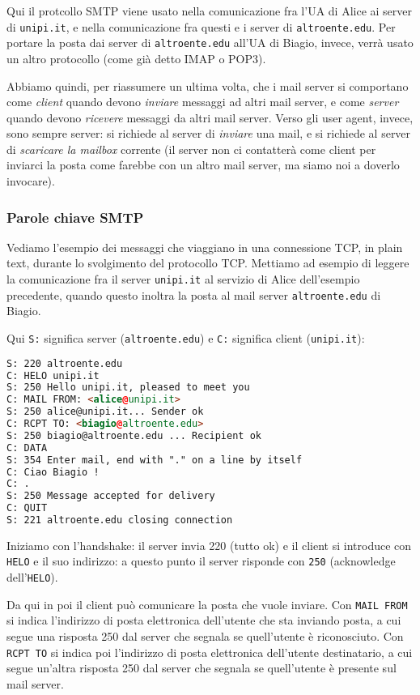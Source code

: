 \documentclass[a4paper,11pt]{article}
\begin{document}
Qui il protcollo SMTP viene usato nella comunicazione fra l'UA di Alice ai server di \lstinline|unipi.it|, e nella comunicazione fra questi e i server di \lstinline|altroente.edu|.
Per portare la posta dai server di \lstinline|altroente.edu| all'UA di Biagio, invece, verrà usato un altro protocollo (come già detto IMAP o POP3).

Abbiamo quindi, per riassumere un ultima volta, che i mail server si comportano come \textit{client} quando devono \textit{inviare} messaggi ad altri mail server, e come \textit{server} quando devono \textit{ricevere} messaggi da altri mail server.
Verso gli user agent, invece, sono sempre server: si richiede al server di \textit{inviare} una mail, e si richiede al server di \textit{scaricare la mailbox} corrente (il server non ci contatterà come client per inviarci la posta come farebbe con un altro mail server, ma siamo noi a doverlo invocare). 

\subsubsection{Parole chiave SMTP}
Vediamo l'esempio dei messaggi che viaggiano in una connessione TCP, in plain text, durante lo svolgimento del protocollo TCP.
Mettiamo ad esempio di leggere la comunicazione fra il server \lstinline|unipi.it| al servizio di Alice dell'esempio precedente, quando questo inoltra la posta al mail server \lstinline|altroente.edu| di Biagio.

Qui \lstinline|S:| significa server (\lstinline|altroente.edu|) e \lstinline|C:| significa client (\lstinline|unipi.it|):
\begin{lstlisting}[language=html, style=codestyle]	
S: 220 altroente.edu
C: HELO unipi.it 
S: 250 Hello unipi.it, pleased to meet you
C: MAIL FROM: <alice@unipi.it>
S: 250 alice@unipi.it... Sender ok
C: RCPT TO: <biagio@altroente.edu>
S: 250 biagio@altroente.edu ... Recipient ok
C: DATA
S: 354 Enter mail, end with "." on a line by itself
C: Ciao Biagio ! 
C: .
S: 250 Message accepted for delivery
C: QUIT
S: 221 altroente.edu closing connection
\end{lstlisting}

Iniziamo con l'handshake: il server invia 220 (tutto ok) e il client si introduce con \lstinline|HELO| e il suo indirizzo: a questo punto il server risponde con \lstinline|250| (acknowledge dell'\lstinline|HELO|).

Da qui in poi il client può comunicare la posta che vuole inviare.
Con \lstinline|MAIL FROM| si indica l'indirizzo di posta elettronica dell'utente che sta inviando posta, a cui segue una risposta 250 dal server che segnala se quell'utente è riconosciuto. 
Con \lstinline|RCPT TO| si indica poi l'indirizzo di posta elettronica dell'utente destinatario, a cui segue un'altra risposta 250 dal server che segnala se quell'utente è presente sul mail server. 
\end{document}
